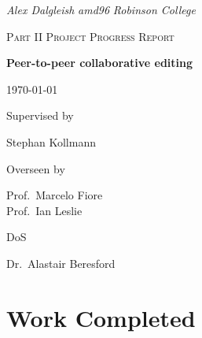\documentclass[12pt,a4paper]{article}
\author{Alex Dalgleish amd96 Robinson}
\begin{document}
 \begin{titlepage}
        \large
        \begin{center}
        \textit{Alex Dalgleish} 
        \textit{amd96} 
        \textit{Robinson College}
        \end{center}
    	\vfill

    \begin{center}
      {\scshape\Large Part II Project Progress Report}
		\vspace{1cm}\\
      {\huge \textbf{Peer-to-peer collaborative editing}\par}
      \vspace{1cm}
      {\large \today}
      \vfill
		
      \begin{minipage}{0.32\textwidth}
        \begin{center}
    	    Supervised by\par
    	    Stephan Kollmann \\
        \end{center}
      \end{minipage}\hfill\noindent
      \begin{minipage}{0.32\textwidth}
      	\begin{center}
  	      Overseen by\par
  	      Prof.~Marcelo Fiore \\
          Prof.~Ian Leslie
        \end{center}
      \end{minipage}
      \begin{minipage}{0.32\textwidth}
        \begin{center}
  	       DoS\par
  	     Dr.~Alastair Beresford \\
        \end{center}
      \end{minipage}

    \end{center}
  \end{titlepage}\newpage
\vspace*{-3.5cm}
\section*{Work Completed}
\end{document}
